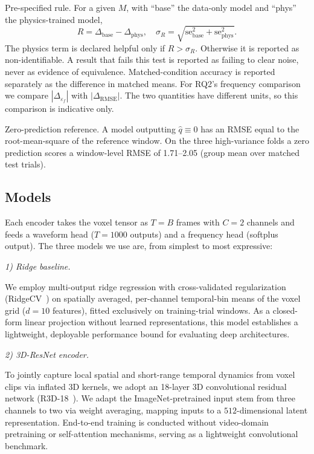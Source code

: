 \documentclass[conference]{IEEEtran}
\begin{document}
Pre-specified rule. For a given $M$, with ``base'' the data-only model and ``phys'' the physics-trained model,
\begin{equation}
R = \Delta_{\mathrm{base}} - \Delta_{\mathrm{phys}}, \quad \sigma_R = \sqrt{\mathrm{se}_{\mathrm{base}}^2 + \mathrm{se}_{\mathrm{phys}}^2}. \label{eq:o5}
\end{equation}
The physics term is declared helpful only if $R > \sigma_R$. Otherwise it is reported as non-identifiable. A result that fails this test is reported as failing to clear noise, never as evidence of equivalence. Matched-condition accuracy is reported separately as the difference in matched means. For RQ2's frequency comparison we compare $|\Delta_{\varepsilon_f}|$ with $|\Delta_{\mathrm{RMSE}}|$. The two quantities have different units, so this comparison is indicative only.

Zero-prediction reference. A model outputting $\hat{q} \equiv 0$ has an RMSE equal to the root-mean-square of the reference window. On the three high-variance folds a zero prediction scores a window-level RMSE of 1.71--2.05 (group mean over matched test trials).

\subsection{Models}
Each encoder takes the voxel tensor as $T = B$ frames with $C = 2$ channels and feeds a waveform head ($T = 1000$ outputs) and a frequency head (softplus output). The three models we use are, from simplest to most expressive:

\noindent\textit{1) Ridge baseline.}

We employ multi-output ridge regression with cross-validated regularization (RidgeCV~\cite{Pedregosa2011}) on spatially averaged, per-channel temporal-bin means of the voxel grid ($d = 10$ features), fitted exclusively on training-trial windows. As a closed-form linear projection without learned representations, this model establishes a lightweight, deployable performance bound for evaluating deep architectures.

\noindent\textit{2) 3D-ResNet encoder.}

To jointly capture local spatial and short-range temporal dynamics from voxel clips via inflated 3D kernels, we adopt an 18-layer 3D convolutional residual network (R3D-18~\cite{He2016}). We adapt the ImageNet-pretrained input stem from three channels to two via weight averaging, mapping inputs to a $512$-dimensional latent representation. End-to-end training is conducted without video-domain pretraining or self-attention mechanisms, serving as a lightweight convolutional benchmark.
\end{document}
